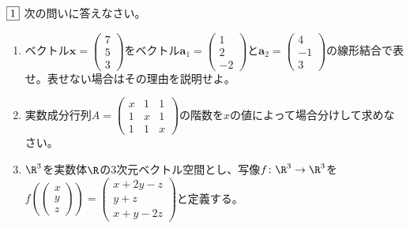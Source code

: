 \begin{tcolorbox} %
	$\fbox{1}$ 次の問いに答えなさい。
\begin{enumerate}
	\item ベクトル$\bm{x}= \begin{pmatrix}7\\ 5\\ 3\end{pmatrix}$をベクトル$\bm{a}_1= \begin{pmatrix}1\\ 2\\ -2\end{pmatrix}$と$\bm{a}_2= \begin{pmatrix}4\\ -1\\ 3\end{pmatrix}$の線形結合で表せ。表せない場合はその理由を説明せよ。
	\item 実数成分行列$A= \begin{pmatrix}x& 1& 1\\ 1& x& 1\\ 1& 1& x\end{pmatrix}$の階数を$x$の値によって場合分けして求めなさい。
	\item $\R^3$を実数体$\R$の3次元ベクトル空間とし、写像$f\colon \R^3\to \R^3$を$f\left(\begin{pmatrix}x\\ y\\ z\end{pmatrix}\right)= \begin{pmatrix}{x+ 2y- z}\\ {y+ z}\\ {x+ y- 2z}\end{pmatrix}$と定義する。
\end{enumerate}
\end{tcolorbox}

